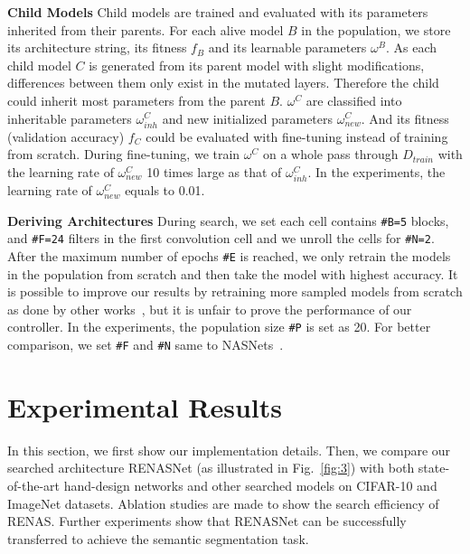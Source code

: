 \documentclass[10pt,twocolumn,letterpaper]{article}
\begin{document}
\noindent
\textbf{Child Models}\quad
Child models are trained and evaluated with its parameters inherited from their parents.
For each alive model $B$ in the population, we store its architecture string, its fitness $f_B$ and its learnable parameters $\omega^B$.
As each child model $C$ is generated from its parent model with slight modifications, differences between them only exist in the mutated layers. Therefore the child could inherit most parameters from the parent $B$. $\omega^C$ are classified into inheritable parameters $\omega^C_{inh}$ and new initialized parameters $\omega^C_{new}$.
And its fitness (validation accuracy) $f_C$ could be evaluated with fine-tuning instead of training from scratch. During fine-tuning, we train $\omega^C$ on a whole pass through $D_{train}$ with the learning rate of $\omega^C_{new}$ 10 times large as that of $\omega^C_{inh}$. In the experiments, the learning rate of $\omega^C_{new}$ equals to 0.01.

\noindent
\textbf{Deriving Architectures}\quad
During search, we set each cell contains \texttt{\#B=5} blocks, and \texttt{\#F=24} filters in the first convolution cell and we unroll the cells for \texttt{\#N=2}.
After the maximum number of epochs \texttt{\#E} is reached, we only retrain the models in the population from scratch and then take the model with highest accuracy. It is possible to improve our results by retraining more sampled models from scratch as done by other works~\cite{zoph2017learning,zoph2016neural}, but it is unfair to prove the performance of our controller. In the experiments, the population size \texttt{\#P} is set as 20.
For better comparison, we set \texttt{\#F} and \texttt{\#N} same to NASNets~\cite{zoph2017learning}.


\section{Experimental Results}
\label{5}
In this section, we first show our implementation details.
Then, we compare our searched architecture RENASNet (as illustrated in Fig.~\ref{fig:3}) with both state-of-the-art hand-design networks and other searched models on CIFAR-10 and ImageNet datasets. %
Ablation studies are made to show the search efficiency of RENAS. Further experiments show that RENASNet can be successfully transferred to achieve the semantic segmentation task.
\end{document}
